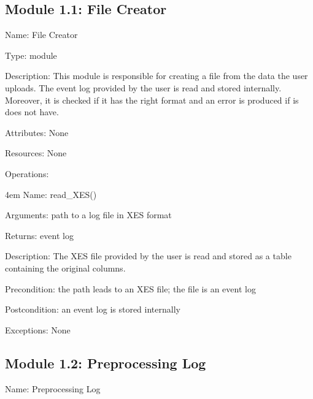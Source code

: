 \documentclass[notitlepage]{article}
\begin{document}
\begin{flushleft}
\subsection{Module 1.1: File Creator}
Name: File Creator

Type: module

Description: This module is responsible for creating a file from the data the user uploads. The event log provided by the user is read and stored internally. Moreover, it is checked if it has the right format and an error is produced if is does not have. 

Attributes: None

Resources: None

Operations: 
\medskip







\par
\endgroup

\medskip

\par
\begingroup
\leftskip4em
Name: read\_XES()

Arguments: path to a log file in XES format

Returns: event log 

Description: The XES file provided by the user is read and stored as a table containing the original columns.

Precondition: the path leads to an XES file; the file is an event log

Postcondition: an event log is stored internally

Exceptions: None
\par
\endgroup

\medskip

\subsection{Module 1.2: Preprocessing Log}
Name: Preprocessing Log


\end{flushleft}
\end{document}
